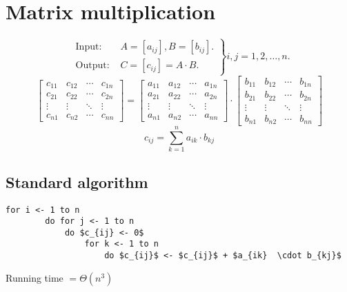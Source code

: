 \documentclass[11pt,toc=twocol]{elegantbook}
\begin{document}
\section{Matrix multiplication}
\begin{definition}
    $$
\left.\begin{array}{ll}
\text { Input: } & A=\left[a_{i j}\right], B=\left[b_{i j}\right] . \\
\text { Output: } & C=\left[c_{i j}\right]=A \cdot B .
\end{array}\right\} i, j=1,2, \ldots, n .
$$
$$
\left[\begin{array}{cccc}
c_{11} & c_{12} & \cdots & c_{1 n} \\
c_{21} & c_{22} & \cdots & c_{2 n} \\
\vdots & \vdots & \ddots & \vdots \\
c_{n 1} & c_{n 2} & \cdots & c_{n n}
\end{array}\right]=\left[\begin{array}{cccc}
a_{11} & a_{12} & \cdots & a_{1 n} \\
a_{21} & a_{22} & \cdots & a_{2 n} \\
\vdots & \vdots & \ddots & \vdots \\
a_{n 1} & a_{n 2} & \cdots & a_{n n}
\end{array}\right] \cdot\left[\begin{array}{cccc}
b_{11} & b_{12} & \cdots & b_{1 n} \\
b_{21} & b_{22} & \cdots & b_{2 n} \\
\vdots & \vdots & \ddots & \vdots \\
b_{n 1} & b_{n 2} & \cdots & b_{n n}
\end{array}\right]
$$
$$
c_{i j}=\sum_{k=1}^{n} a_{i k} \cdot b_{k j}
$$
\end{definition}
\subsection{Standard algorithm}

\begin{lstlisting}[mathescape=true]
    for i <- 1 to n
        do for j <- 1 to n
            do $c_{ij} <- 0$
                for k <- 1 to n
                    do $c_{ij}$ <- $c_{ij}$ + $a_{ik}  \cdot b_{kj}$
\end{lstlisting}

Running time $=\Theta\left(n^{3}\right)$
\end{document}
